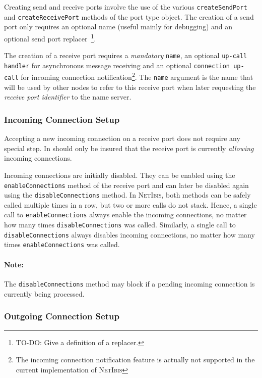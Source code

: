 \documentclass[11pt]{book}
\def\NetIbis{\textsc{NetIbis}\xspace}
\begin{document}
Creating send and receive ports involve the use of the various
\texttt{createSendPort} and \texttt{createReceivePort} methods of the
port type object. The creation of a send port only requires an
optional name (useful mainly for debugging) and an optional send port
replacer~\footnote{TO-DO: Give a definition of a replacer.}.

The creation of a receive port requires a \emph{mandatory}
\texttt{name}, an optional \texttt{up-call handler} for asynchronous
message receiving and an optional \texttt{connection up-call} for
incoming connection notification\footnote{The incoming connection
  notification feature is actually not supported in the current
  implementation of \NetIbis}. The \texttt{name} argument is the name
that will be used by other nodes to refer to this receive port when
later requesting the \emph{receive port identifier} to the name server.

%
\subsubsection{Incoming Connection Setup}
\label{sec:incom-conn-setup}

Accepting a new incoming connection on a receive port does not require
any special step. In should only be insured that the receive port is
currently \emph{allowing} incoming connections.

Incoming connections are initially disabled. They can be enabled using
the \texttt{enableConnections} method of the receive port and can
later be disabled again using the \texttt{disableConnections} method.
In \NetIbis, both methods can be safely called multiple times in a
row, but two or more calls do not stack. Hence, a single call to
\texttt{enableConnections} always enable the incoming connections, no
matter how many times \texttt{disableConnections} was called.
Similarly, a single call to \texttt{disableConnections} always
disables incoming connections, no matter how many times
\texttt{enableConnections} was called.


\paragraph{Note:}
\label{sec:note}

The \texttt{disableConnections} method may block if a pending
incoming connection is currently being processed.

%
\subsubsection{Outgoing Connection Setup}
\label{sec:outg-conn-setup}
\end{document}
